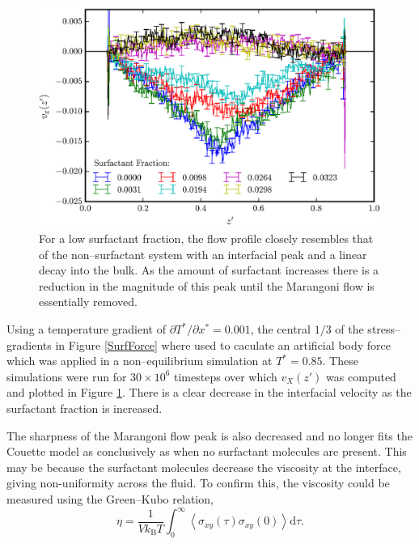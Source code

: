 \begin{figure}[h]
\centering
\includegraphics[scale=0.8]{SurfFlow}
\caption{For a low surfactant fraction, the flow profile closely resembles that of the non--surfactant system with an interfacial peak and a linear decay into the bulk.
As the amount of surfactant increases there is a reduction in the magnitude of this peak until the Marangoni flow is essentially removed.
}
\label{SurfFlow}
\end{figure}
Using a temperature gradient of $\partial T^{*} / \partial x^{*} = 0.001$, the central $1/3$ of the stress--gradients in Figure \ref{SurfForce} where used to caculate an artificial body force which was applied in a non--equilibrium simulation at $T^{*}=0.85$.
These simulations were run for $30 \times 10^{6}$ timesteps over which $v_{X}(z')$ was computed and plotted in Figure \ref{SurfFlow}.
There is a clear decrease in the interfacial velocity as the surfactant fraction is increased.

The sharpness of the Marangoni flow peak is also decreased and no longer fits the Couette model as conclusively as when no surfactant molecules are present.
This may be because the surfactant molecules decrease the viscosity at the interface, giving non-uniformity across the fluid. 
To confirm this, the viscosity could be measured using the Green--Kubo relation,
\begin{equation}
\eta = \frac{1}{V k_{\mathrm{B}} T} \int_{0}^{\infty} \left< \sigma_{xy} \left( \tau \right) \sigma_{xy}(0) \right> \mathrm{d} \tau.
\end{equation}

